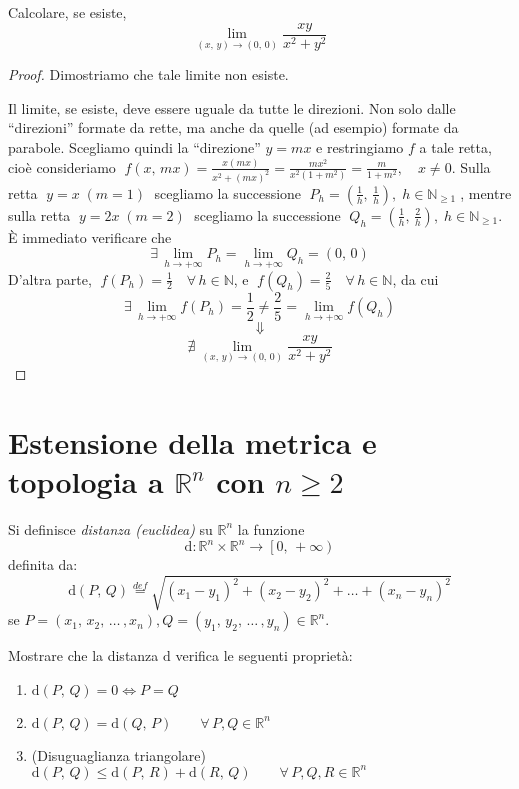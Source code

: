\begin{example}[ii]
Calcolare, se esiste,
$$\lim_{(x,\, y) \rightarrow (0,\, 0)} \frac{xy}{x^2+y^2}$$
\end{example}
\begin{proof}
Dimostriamo che tale limite non esiste.

Il limite, se esiste, deve essere uguale da tutte le direzioni. Non solo dalle ``direzioni'' formate da rette, ma anche da quelle (ad esempio) formate da parabole. Scegliamo quindi la ``direzione'' $y = mx$ e restringiamo $f$ a tale retta, cioè consideriamo $\; f(x,\, mx) = \frac{x(mx)}{x^2+(mx)^2} = \frac{mx^2}{x^2(1 + m^2)} = \frac{m}{1 + m^2}, \quad x \neq 0$. Sulla retta $\; y=x \; (m=1) \;$ scegliamo la successione $\; P_h = (\frac{1}{h},\, \frac{1}{h}), \; h \in \mathbb{N}_{\geq 1} \;$, mentre sulla retta $\; y=2x \; (m=2) \;$ scegliamo la successione $\; Q_h = (\frac{1}{h},\, \frac{2}{h}), \; h \in \mathbb{N}_{\geq 1}$. \`E immediato verificare che
$$\exists \, \lim_{h \rightarrow +\infty} P_h = \lim_{h \rightarrow +\infty} Q_h = (0,\, 0)$$
D'altra parte, $\; f(P_h) = \frac{1}{2} \quad \forall \, h \in \mathbb{N}$, e $\; f(Q_h) = \frac{2}{5} \quad \forall \, h \in \mathbb{N}$, da cui
$$
\exists \, \lim_{h \rightarrow +\infty} f(P_h) = \frac{1}{2} \neq \frac{2}{5} = \lim_{h \rightarrow +\infty} f(Q_h)
$$
$$\Downarrow$$
$$
\nexists \, \lim_{(x,\, y) \rightarrow (0,\, 0)} \frac{xy}{x^2+y^2}
$$
\end{proof}



\section{Estensione della metrica e topologia a $\mathbb{R}^n$ con $n \geq 2$}
\begin{definition}
Si definisce \emph{distanza (euclidea)} su $\mathbb{R}^n$ la funzione$$\mathrm{d}:\mathbb{R}^n \times \mathbb{R}^n \longrightarrow \left[0,\, +\infty\right)$$
definita da:
$$\mathrm{d}(P,\, Q) \overset{def}{=} \sqrt{(x_1-y_1)^2+(x_2-y_2)^2+ \ldots +(x_n-y_n)^2}$$
se $P=(x_1,\, x_2,\, \ldots \, ,x_n),Q=(y_1,\, y_2,\, \ldots \, ,y_n) \in \mathbb{R}^n$.
\end{definition}

\begin{exer}
Mostrare che la distanza $\mathrm{d}$ verifica le seguenti proprietà:
\begin{enumerate}[labelindent=\parindent,leftmargin=*,label=\textnormal{(d\arabic*)},start=1]
\item $\mathrm{d}(P,\, Q) = 0 \Longleftrightarrow P=Q$
\item $\mathrm{d}(P,\, Q) = \mathrm{d}(Q,\, P) \qquad \forall \, P,Q \in \mathbb{R}^n$
\item (Disuguaglianza triangolare) $\mathrm{d}(P,\, Q) \leq \mathrm{d}(P,\, R) + \mathrm{d}(R,\, Q) \qquad \forall \, P,Q,R \in \mathbb{R}^n$
\end{enumerate}
\end{exer}

